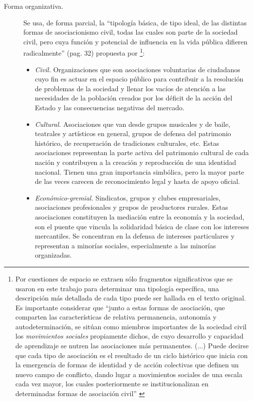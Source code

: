 \documentclass[letterpaper, 11pt]{book}
\theoremstyle{definition}
\theoremstyle{remark}
\begin{document}
\begin{description}
\begin{itemize}
    \end{itemize}
    \item[Forma organizativa.] Se usa, de forma parcial, la ``tipología básica, de tipo ideal, de las distintas formas de asociacionismo civil, todas las cuales son parte de la sociedad civil, pero cuya función y potencial de influencia en la vida pública difieren radicalmente'' (pag. 32) propuesta por \citet{2015_Olvera_RepresentacionesOSC}\footnote{
	Por cuestiones de espacio se extraen sólo fragmentos significativos que se usaron en este trabajo para determinar una tipología específica, una descripción más detallada de cada tipo puede ser hallada en el texto original. 
	Es importante considerar que ``junto a estas formas de asociación, que comparten las características de relativa permanencia, autonomía y autodeterminación, se sitúan como miembros importantes de la sociedad civil los \emph{movimientos sociales} propiamente dichos, de cuyo desarrollo y capacidad de aprendizaje se nutren las asociaciones más permanentes. (...)  
	Puede decirse que cada tipo de asociación es el resultado de un ciclo histórico que inicia con la emergencia de formas de identidad y de acción colectivas que definen un nuevo campo de conflicto, dando lugar a movimientos sociales de una escala cada vez mayor, los cuales posteriormente se institucionalizan en determinadas formas de asociación civil'' \citep[36]{2015_Olvera_RepresentacionesOSC}
    }:
    \begin{itemize}
        \item \emph{Civil.} Organizaciones que son asociaciones voluntarias de ciudadanos cuyo fin es actuar en el espacio público para contribuir a la resolución de problemas de la sociedad y llenar los vacíos de atención a las necesidades de la población creados por los déficit de la acción del Estado y las consecuencias negativas del mercado.
        \item \emph{Cultural.} 
        Asociaciones que van desde grupos musicales y de baile, teatrales y artísticos en general, grupos de defensa del patrimonio histórico, de recuperación de tradiciones culturales, etc. Estas asociaciones representan la parte activa del patrimonio cultural de cada nación y contribuyen a la creación y reproducción de una identidad nacional. 
        Tienen una gran importancia simbólica, pero la mayor parte de las veces carecen de reconocimiento legal y hasta de apoyo oficial.
        \item \emph{Económico-gremial.} Sindicatos, grupos y clubes empresariales, asociaciones profesionales y grupos de productores rurales. Estas asociaciones constituyen la mediación entre la economía y la sociedad, son el puente que vincula la solidaridad básica de clase con los intereses mercantiles. Se concentran en la defensa de intereses particulares y representan a minorías sociales, especialmente a las minorías organizadas.

\end{itemize}
\end{description}
\end{document}
